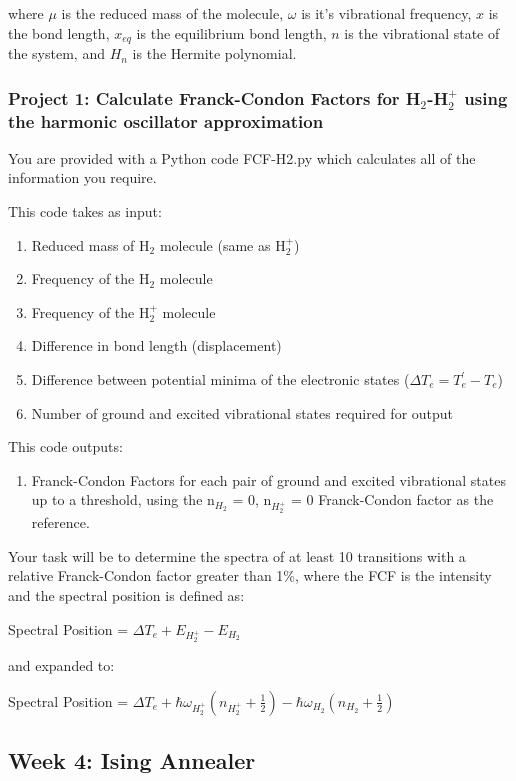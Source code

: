 \documentclass[12pt]{article}
\begin{document}
\noindent where $\mu$ is the reduced mass of the molecule, $\omega$ is it's vibrational frequency, $x$ is the bond length, $x_{eq}$ is the equilibrium bond length, $n$ is the vibrational state of the system, and $H_n$ is the Hermite polynomial.

\subsubsection{Project 1: Calculate Franck-Condon Factors for H$_2$-H$_2^+$ using the harmonic oscillator approximation}
You are provided with a Python code FCF-H2.py which calculates all of the information you require.

\noindent This code takes as input:
\begin{enumerate}
    \item Reduced mass of H$_2$ molecule (same as H$_2^+$)
    \item Frequency of the H$_2$ molecule
    \item Frequency of the H$_2^+$ molecule
    \item Difference in bond length (displacement)
    \item Difference between potential minima of the electronic states ($\Delta T_e = T_e^{'} - T_e$)
    \item Number of ground and excited vibrational states required for output
\end{enumerate}

\noindent This code outputs:
\begin{enumerate}
    \item Franck-Condon Factors for each pair of ground and excited vibrational states up to a threshold, using the n$_{H_2}$ = 0, n$_{H_2^+}$ = 0 Franck-Condon factor as the reference.
\end{enumerate}

\noindent Your task will be to determine the spectra of at least 10 transitions with a relative Franck-Condon factor greater than 1\%, where the FCF is the intensity and the spectral position is defined as:


Spectral Position = $\Delta T_e + E_{H_2^+} - E_{H_2}$

and expanded to:

Spectral Position = $\Delta T_e +\hbar\omega_{H_2^+}(n_{H_2^+} + \frac{1}{2}) - \hbar\omega_{H_2}(n_{H_2} + \frac{1}{2})$
\newpage

\subsection{Week 4: Ising Annealer}

\newpage



\end{document}
